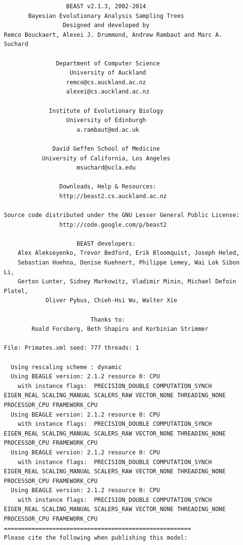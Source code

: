 \documentclass[11pt]{article}
\theoremstyle{plain}%
\theoremstyle{definition}
\theoremstyle{remark}
\begin{document}
{\scriptsize   
\begin{verbatim}
                  BEAST v2.1.3, 2002-2014
       Bayesian Evolutionary Analysis Sampling Trees
                 Designed and developed by
Remco Bouckaert, Alexei J. Drummond, Andrew Rambaut and Marc A. Suchard
                              
               Department of Computer Science
                   University of Auckland
                  remco@cs.auckland.ac.nz
                  alexei@cs.auckland.ac.nz
                              
             Institute of Evolutionary Biology
                  University of Edinburgh
                     a.rambaut@ed.ac.uk
                              
              David Geffen School of Medicine
           University of California, Los Angeles
                     msuchard@ucla.edu
                              
                Downloads, Help & Resources:
              	http://beast2.cs.auckland.ac.nz
                              
Source code distributed under the GNU Lesser General Public License:
              	http://code.google.com/p/beast2
                              
                     BEAST developers:
	Alex Alekseyenko, Trevor Bedford, Erik Bloomquist, Joseph Heled, 
	Sebastian Hoehna, Denise Kuehnert, Philippe Lemey, Wai Lok Sibon Li, 
	Gerton Lunter, Sidney Markowitz, Vladimir Minin, Michael Defoin Platel, 
          	Oliver Pybus, Chieh-Hsi Wu, Walter Xie
                              
                         Thanks to:
    	Roald Forsberg, Beth Shapiro and Korbinian Strimmer

File: Primates.xml seed: 777 threads: 1

  Using rescaling scheme : dynamic
  Using BEAGLE version: 2.1.2 resource 0: CPU
    with instance flags:  PRECISION_DOUBLE COMPUTATION_SYNCH EIGEN_REAL SCALING_MANUAL SCALERS_RAW VECTOR_NONE THREADING_NONE PROCESSOR_CPU FRAMEWORK_CPU
  Using BEAGLE version: 2.1.2 resource 0: CPU
    with instance flags:  PRECISION_DOUBLE COMPUTATION_SYNCH EIGEN_REAL SCALING_MANUAL SCALERS_RAW VECTOR_NONE THREADING_NONE PROCESSOR_CPU FRAMEWORK_CPU
  Using BEAGLE version: 2.1.2 resource 0: CPU
    with instance flags:  PRECISION_DOUBLE COMPUTATION_SYNCH EIGEN_REAL SCALING_MANUAL SCALERS_RAW VECTOR_NONE THREADING_NONE PROCESSOR_CPU FRAMEWORK_CPU
  Using BEAGLE version: 2.1.2 resource 0: CPU
    with instance flags:  PRECISION_DOUBLE COMPUTATION_SYNCH EIGEN_REAL SCALING_MANUAL SCALERS_RAW VECTOR_NONE THREADING_NONE PROCESSOR_CPU FRAMEWORK_CPU
======================================================
Please cite the following when publishing this model:


\end{verbatim}}
\end{document}
